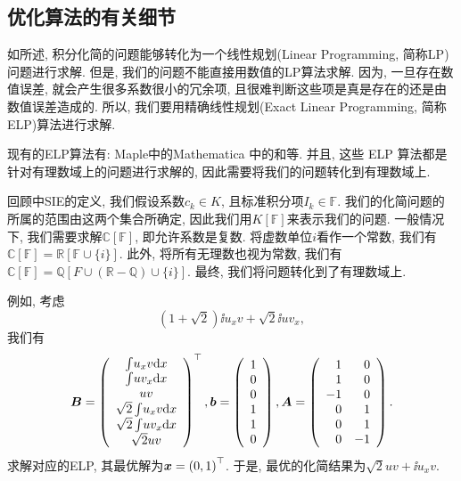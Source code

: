 \subsection{优化算法的有关细节}\label{optMethods-03}

如所述, 积分化简的问题能够转化为一个线性规划(Linear Programming, 简称LP)问题进行求解. 但是, 我们的问题不能直接用数值的LP算法求解. 因为, 一旦存在数值误差, 就会产生很多系数很小的冗余项, 且很难判断这些项是真是存在的还是由数值误差造成的. 所以, 我们要用精确线性规划(Exact Linear Programming, 简称ELP)算法进行求解. 

现有的ELP算法有: Maple中的\D Mathematica 中的\D {}\cite{soplex}和\cite{qsoptex}等. 并且, 这些 ELP 算法都是针对有理数域上的问题进行求解的, 因此需要将我们的问题转化到有理数域上. 

回顾中SIE的定义, 我们假设系数$c_k\in K$, 且标准积分项$I_k\in \mathbb F$. 我们的化简问题的所属的范围由这两个集合所确定, 因此我们用$K[\mathbb F]$来表示我们的问题. 一般情况下, 我们需要求解$\mathbb C[\mathbb F]$, 即允许系数是复数. 将虚数单位$i$看作一个常数, 我们有$\mathbb C[\mathbb F]=\mathbb R[\mathbb F \cup \{i\}]$. 此外, 将所有无理数也视为常数, 我们有$\mathbb C[\mathbb F]=\mathbb Q[F\cup (\mathbb R - \mathbb Q) \cup \{i\}]$. 最终, 我们将问题转化到了有理数域上. 

\begin{example}
例如, 考虑
\begin{equation}
\left(1+\sqrt{2}\right)\ii{u_x v}+\sqrt{2}\ii{u v_x}, 
\end{equation}
我们有 
\begin{equation}
\bm{B}=\left(
\begin{array}{c}
\int\!{u_x v\mathrm{d}x}  \\
\int\!{u v_x\mathrm{d}x}  \\
u v         \\
\sqrt{2}\int\!{u_x v\mathrm{d}x}  \\
\sqrt{2}\int\!{u v_x\mathrm{d}x}  \\
\sqrt{2}u v         \\
\end{array}
\right)^\top,
\bm{b}=\left(
\begin{array}{c}
1   \\
0   \\
0   \\
1   \\
1   \\
0   \\
\end{array}
\right),
\bm{A}=\left(
\begin{array}{rr}
1   & 0\\
1   & 0\\
-1  & 0\\
0   & 1\\
0   & 1\\
0   & -1\\
\end{array}
\right).
\end{equation}
求解对应的ELP, 其最优解为$\bm{x}=\left(0,1\right)^\top$. 于是, 最优的化简结果为$\sqrt{2}uv+\ii{u_x v}$. 
\end{example}

